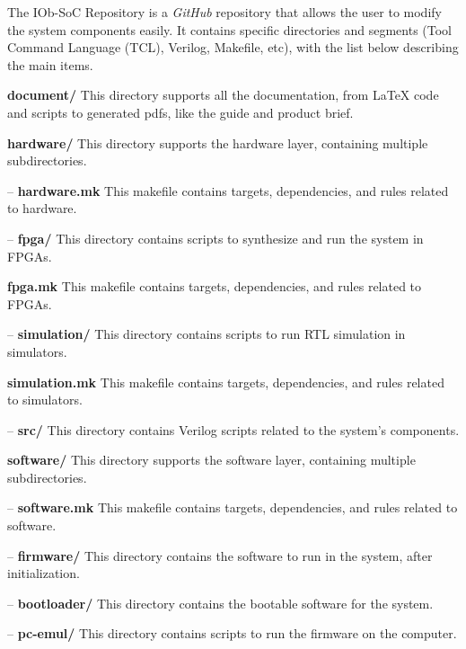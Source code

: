 The IOb-SoC Repository is a \textit{GitHub} repository that allows the user to modify the system components easily. It contains specific directories and segments (Tool Command Language (TCL), Verilog, Makefile, etc), with the list below describing the main items.

\textbf{document/} This directory supports all the documentation, from LaTeX code and scripts to generated pdfs, like the guide and product brief.

\textbf{hardware/} This directory supports the hardware layer, containing multiple subdirectories.

\hspace{0.5cm} – \textbf{hardware.mk} This makefile contains targets, dependencies, and rules related to hardware.

\hspace{0.5cm} – \textbf{fpga/} This directory contains scripts to synthesize and run the system in FPGAs.

\hspace{1.2cm}\textbf{fpga.mk} This makefile contains targets, dependencies, and rules related to FPGAs.

\hspace{0.5cm} – \textbf{simulation/} This directory contains scripts to run RTL simulation in simulators.

\hspace{1.2cm}\textbf{simulation.mk} This makefile contains targets, dependencies, and rules related to simulators.

\hspace{0.5cm}– \textbf{src/} This directory contains Verilog scripts related to the system’s components.

\textbf{software/} This directory supports the software layer, containing multiple subdirectories.

\hspace{0.5cm}– \textbf{software.mk} This makefile contains targets, dependencies, and rules related to software.

\hspace{0.5cm}– \textbf{firmware/} This directory contains the software to run in the system, after initialization.

\hspace{0.5cm}– \textbf{bootloader/} This directory contains the bootable software for the system.

\hspace{0.5cm}– \textbf{pc-emul/} This directory contains scripts to run the firmware on the computer.

